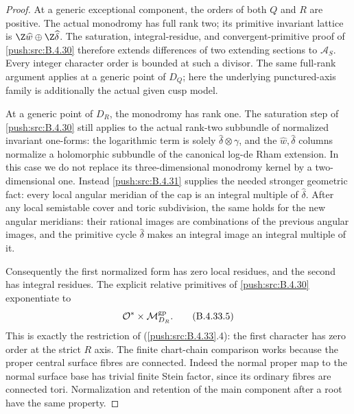 \begin{proof}
At a generic exceptional component, the
orders of both $Q$ and $R$ are positive.
The actual monodromy has full rank two;
its primitive invariant lattice is
$\Z\widehat w\oplus\Z\widehat\delta$.
The saturation, integral-residue, and
convergent-primitive proof of \ref{push:src:B.4.30}
therefore extends differences of two
extending sections to $\mathcal A_S$.
Every integer character order is bounded
at such a divisor. The same full-rank
argument applies at a generic point of
$D_Q$; here the underlying punctured-axis
family is additionally the actual given
cusp model.

At a generic point of $D_R$, the monodromy
has rank one. The saturation step of
\ref{push:src:B.4.30} still applies to the actual
rank-two subbundle of normalized invariant
one-forms:
the logarithmic term is solely
$\widehat\delta\otimes\gamma$, and the
$\widehat w,\widehat\delta$ columns
normalize a holomorphic subbundle of the
canonical log-de Rham extension. In this
case we do not replace its three-dimensional
monodromy kernel by a two-dimensional one.
Instead \ref{push:src:B.4.31} supplies the needed stronger
geometric fact: every local angular
meridian of the cap is an integral multiple
of $\widehat\delta$. After any local
semistable cover and toric subdivision,
the same holds for the new angular
meridians: their rational images are
combinations of the previous angular
images, and the primitive cycle
$\widehat\delta$ makes an integral image
an integral multiple of it.

Consequently the first normalized form
has zero local residues, and the second
has integral residues. The explicit
relative primitives of \ref{push:src:B.4.30} exponentiate
to
\[
             \mathcal O^*\times
                    \mathcal M_{D_R}^{\rm gp}.
 \tag{B.4.33.5}
\]
This is exactly the restriction of
(\ref{push:src:B.4.33}.4): the first character has zero
order at the strict $R$ axis. The finite
chart-chain comparison works because the
proper central surface fibres are
connected. Indeed the normal proper map
to the normal surface base has trivial
finite Stein factor, since its ordinary
fibres are connected tori. Normalization
and retention of the main component after
a root have the same property.


\end{proof}
